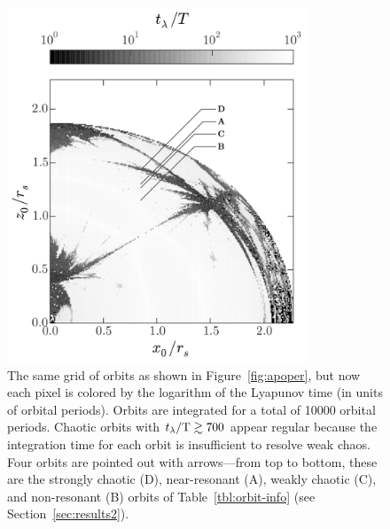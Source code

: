 \documentclass[letterpaper,12pt,preprint]{aastex}
\newcommand{\periods}{\ensuremath{{\rm T}}}
\begin{document}
\begin{figure}[!h]%
\begin{center}
\includegraphics[width=0.8\textwidth, trim={0 0 0 0}]{figures/lyap_map.pdf}
\caption{ The same grid of orbits as shown in Figure~\ref{fig:apoper}, but now each pixel is colored by the logarithm of the Lyapunov time (in units of orbital periods). Orbits are integrated for a total of 10000 orbital periods. Chaotic orbits with $t_\lambda/\periods \gtrsim 700$ appear regular because the integration time for each orbit is insufficient to resolve weak chaos. Four orbits are pointed out with arrows---from top to bottom, these are the strongly chaotic (D), near-resonant (A), weakly chaotic (C), and non-resonant (B) orbits of Table~\ref{tbl:orbit-info} (see Section~\ref{sec:results2}).} \label{fig:lyapmap}
\end{center}
\end{figure}
\end{document}
